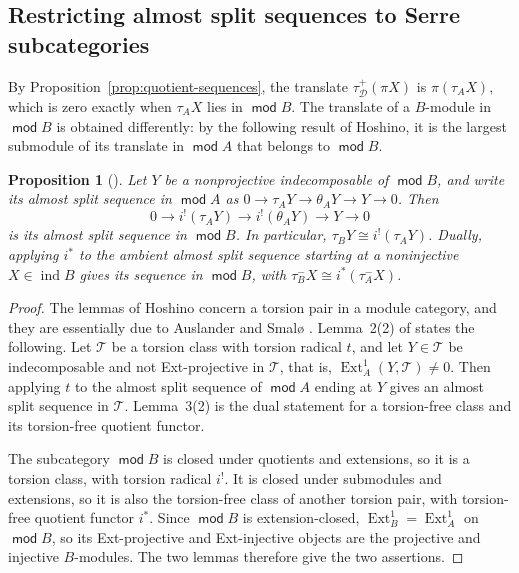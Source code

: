 \documentclass[a4paper,reqno,10pt]{amsart}
\newtheorem{proposition}[theorem]{Proposition}
\theoremstyle{definition}
\numberwithin{equation}{section}
\DeclareMathOperator{\moduleCategory}{\mathsf{mod}}
\renewcommand{\mod}{\moduleCategory}
\DeclareMathOperator{\ind}{ind}
\DeclareMathOperator{\Ext}{Ext}
\newcommand{\cD}{\mathcal D}
\begin{document}
\subsection{Restricting almost split sequences to Serre subcategories}\label{subsec:restriction}
By Proposition~\ref{prop:quotient-sequences}, the translate
\(\tau_{\cD}^+(\pi X)\) is \(\pi(\tau_A X)\), which is zero exactly when
\(\tau_A X\) lies in \(\mod B\). The translate of a
\(B\)-module in \(\mod B\) is obtained differently: by the following
result of Hoshino, it is the largest submodule of its translate in
\(\mod A\) that belongs to \(\mod B\).

\begin{proposition}[{\cite[Section~1, Lemmas~2(2) and~3(2)]{Hos}}]\label{lem:relative-ar}
Let \(Y\) be a nonprojective indecomposable of \(\mod B\), and write its
almost split sequence in \(\mod A\) as
\(0\to\tau_A Y\to\theta_A Y\to Y\to0\). Then
\begin{equation}\label{eq:relative-ar}
 0\longrightarrow i^!(\tau_A Y)\longrightarrow i^!(\theta_A Y)
 \longrightarrow Y\longrightarrow0
\end{equation}
is its almost split sequence in \(\mod B\). In particular,
\(\tau_BY\cong i^!(\tau_A Y)\). Dually, applying \(i^*\) to the
ambient almost split sequence starting at a noninjective \(X\in\ind B\)
gives its sequence in \(\mod B\), with
\(\tau_B^-X\cong i^*(\tau_A^-X)\).
\end{proposition}
\begin{proof}
The lemmas of Hoshino concern a torsion pair in a module category, and
they are essentially due to Auslander and Smal{\o} \cite{AS}. Lemma~2(2) of
\cite{Hos} states the following. Let \(\mathcal T\) be a torsion class with
torsion radical \(t\), and let \(Y\in\mathcal T\) be indecomposable and not
Ext-projective in \(\mathcal T\), that is, \(\Ext_A^1(Y,\mathcal T)\ne0\). Then applying \(t\) to the almost split
sequence of \(\mod A\) ending at \(Y\) gives an almost split sequence in
\(\mathcal T\). Lemma~3(2) is the dual statement for a torsion-free class and
its torsion-free quotient functor.

The subcategory \(\mod B\) is closed under quotients and extensions, so it
is a torsion class, with torsion radical \(i^!\). It is closed under
submodules and extensions, so it is also the torsion-free class of another
torsion pair, with torsion-free quotient functor \(i^*\). Since \(\mod B\)
is extension-closed, \(\Ext_B^1=\Ext_A^1\) on \(\mod B\), so its Ext-projective and Ext-injective objects are the
projective and injective \(B\)-modules. The two lemmas therefore give the
two assertions.
\end{proof}
\end{document}
